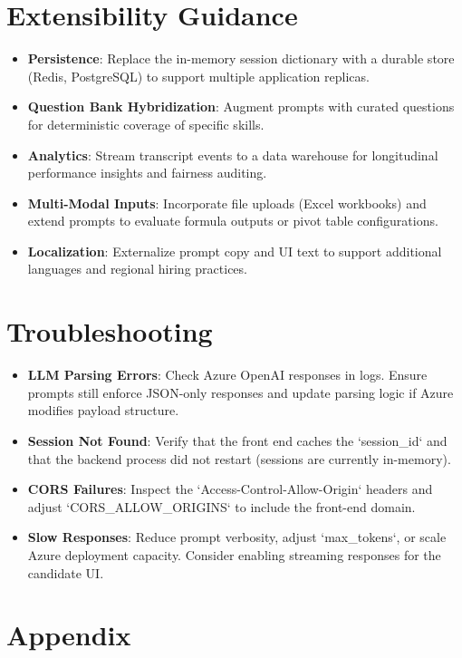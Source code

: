 \documentclass[11pt]{article}
\begin{document}
\section{Extensibility Guidance}
\begin{itemize}[leftmargin=*]
  \item \textbf{Persistence}: Replace the in-memory session dictionary with a durable store (Redis, PostgreSQL) to support multiple application replicas.
  \item \textbf{Question Bank Hybridization}: Augment prompts with curated questions for deterministic coverage of specific skills.
  \item \textbf{Analytics}: Stream transcript events to a data warehouse for longitudinal performance insights and fairness auditing.
  \item \textbf{Multi-Modal Inputs}: Incorporate file uploads (Excel workbooks) and extend prompts to evaluate formula outputs or pivot table configurations.
  \item \textbf{Localization}: Externalize prompt copy and UI text to support additional languages and regional hiring practices.
\end{itemize}

\section{Troubleshooting}
\begin{itemize}[leftmargin=*]
  \item \textbf{LLM Parsing Errors}: Check Azure OpenAI responses in logs. Ensure prompts still enforce JSON-only responses and update parsing logic if Azure modifies payload structure.
  \item \textbf{Session Not Found}: Verify that the front end caches the `session_id` and that the backend process did not restart (sessions are currently in-memory).
  \item \textbf{CORS Failures}: Inspect the `Access-Control-Allow-Origin` headers and adjust `CORS_ALLOW_ORIGINS` to include the front-end domain.
  \item \textbf{Slow Responses}: Reduce prompt verbosity, adjust `max_tokens`, or scale Azure deployment capacity. Consider enabling streaming responses for the candidate UI.
\end{itemize}

\section{Appendix}
\end{document}

